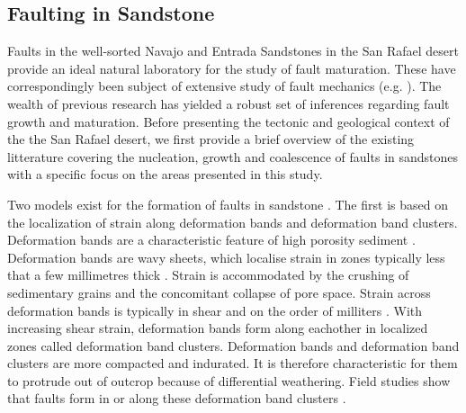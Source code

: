 \documentclass[12pt,a4paper]{article}
\begin{document}




\subsection{Faulting in Sandstone}

	Faults in the well-sorted Navajo and Entrada Sandstones in the San Rafael desert provide an ideal natural laboratory for the study of fault maturation. These have correspondingly been subject of extensive study of fault mechanics (e.g. \cite{aydin1977faulting, aydin1978development, krantz1986orthorhombic, shipton2001damage, shipton2002structural, shipton2003conceptual, fossen1998deformation, fossen2005fault}  \cite{fossen2007deformation}). The wealth of previous research has yielded a robust set of inferences regarding fault growth and maturation. Before presenting the tectonic and geological context of the the San Rafael desert, we first provide a brief overview of the existing litterature covering the nucleation, growth and coalescence of faults in sandstones with a specific focus on the areas presented in this study.

	Two models exist for the formation of faults in sandstone \cite{aydin1977faulting, davatzes2003overprinting}. The first is based on the localization of strain along deformation bands and deformation band clusters. Deformation bands are a characteristic feature of high porosity sediment \cite{aydin1977faulting, aydin1978development, fossen2007deformation}. Deformation bands are wavy sheets, which localise strain in zones typically less that a few millimetres thick \cite{fossen2007deformation}. Strain is accommodated by the crushing of sedimentary grains and the concomitant collapse of pore space. Strain across deformation bands is typically in shear and on the order of milliters \cite{fossen2007deformation} . With increasing shear strain, deformation bands form along eachother in localized zones called  deformation band clusters. Deformation bands and deformation band clusters are more compacted and indurated. It is therefore characteristic for them to protrude out of outcrop because of differential weathering. Field studies show that faults form in or along these deformation band clusters \cite{aydin1977faulting}. 
\end{document}
